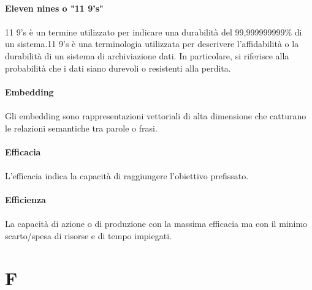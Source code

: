 \documentclass[10pt, a4paper]{article}
\begin{document}
\vspace{2em}
\paragraph{Eleven nines o "11 9's"}\noindent\hrulefill
\paragraph{}11 9's è un termine utilizzato per indicare una durabilità del 99,999999999\% di un sistema.11 9’s è una terminologia utilizzata per descrivere l’affidabilità o la durabilità di un sistema di archiviazione dati. In particolare, si riferisce alla probabilità che i dati siano durevoli o resistenti alla perdita.

\vspace{2em}
\paragraph{Embedding}\noindent\hrulefill
\paragraph{}Gli embedding sono rappresentazioni vettoriali di alta dimensione che catturano le relazioni semantiche tra parole o frasi.

\vspace{2em}
\paragraph{Efficacia}\noindent\hrulefill
\paragraph{}L'efficacia indica la capacità di raggiungere l'obiettivo prefissato.

\vspace{2em}
\paragraph{Efficienza}\noindent\hrulefill
\paragraph{}La capacità di azione o di produzione con la massima efficacia ma con il minimo scarto/spesa di risorse e di tempo impiegati.

\newpage
\section{F}
\end{document}
